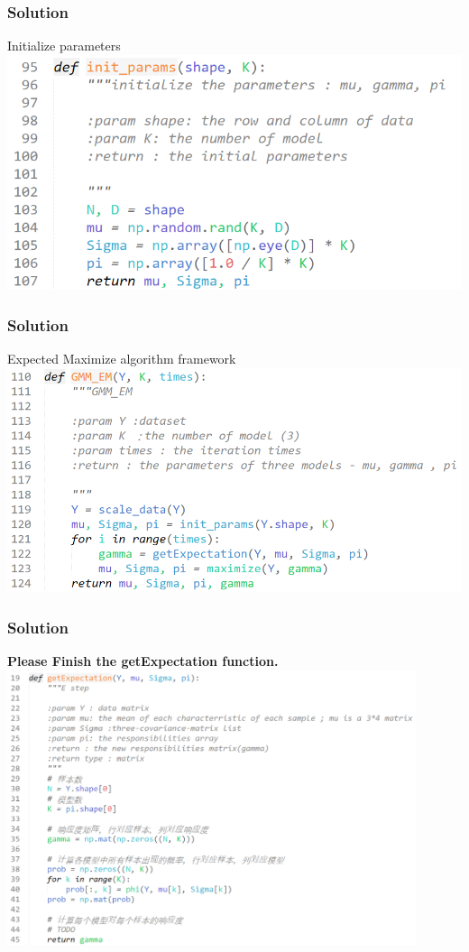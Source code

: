 \documentclass{beamer}
\begin{document}
\begin{frame}
  \frametitle{Solution}

      Initialize parameters
      \\[10pt]
      \includegraphics[width=1.0\textwidth]{Pic/init_params.png}

\end{frame}

\begin{frame}
  \frametitle{Solution}
	   Expected Maximize algorithm framework
      \\[10pt]
      \includegraphics[width=1.0\textwidth]{Pic/GMM_EM.png}

\end{frame}

\begin{frame}
  \frametitle{Solution}
	  \textbf{Please Finish the getExpectation function.}
      \\[10pt]
      \includegraphics[width=0.9\textwidth]{Pic/getExpectation.png}

\end{frame}
\end{document}
